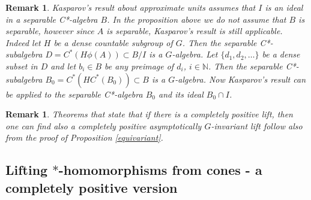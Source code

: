 \documentclass{article}%
\newtheorem{proposition}[theorem]{Proposition}
\newtheorem{remark}[theorem]{Remark}
\begin{document}
\begin{remark} Kasparov's result about approximate units assumes that $I$ is an ideal in a separable C*-algebra $B$. In the proposition above we do not assume that $B$ is separable, however since $A$ is separable, Kasparov's result is still applicable. Indeed let $H$ be a dense countable subgroup of $G$. Then the separable C*-subalgebra $D =C^*(H \phi(A)) \subset B/I$ is a $G$-algebra. Let $\{d_1, d_2, \ldots\}$ be a dense subset in $D$ and let $b_i\in B$ be any preimage of $d_i$, $i\in \mathbb N$. Then the separable C*-subalgebra $B_0 = C^*(H C^*(B_0)) \subset B$ is a $G$-algebra. Now Kasparov's result can be applied to the separable C*-algebra $B_0$ and its ideal $B_0\cap I$.
\end{remark}

\begin{remark} Theorems \cite[Th.3.2, Th. 3.4]{FGT} that state that if there is a completely positive lift, then one can find also a completely positive asymptotically $G$-invariant lift follow also from the proof of Proposition \ref{equivariant}.
\end{remark}










\subsection{Lifting $\ast$-homomorphisms from cones - a completely positive version}
\end{document}
